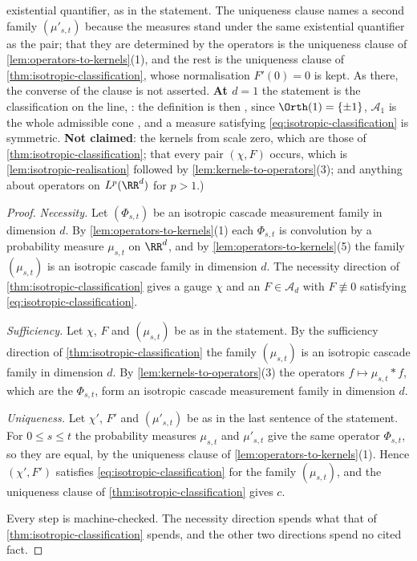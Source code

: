 \begin{theorem}
{existential quantifier, as in the statement. The uniqueness clause names a second family
$(\mu'_{s,t})$ because the measures stand under the same existential quantifier as the pair; that
they are determined by the operators is the uniqueness clause of
\ref{lem:operators-to-kernels}(1), and the rest is the uniqueness clause of
\ref{thm:isotropic-classification}, whose normalisation $F'(0) = 0$ is kept. As there, the converse
of the clause is not asserted. \textbf{At $d = 1$} the statement is the classification on the line,
: the definition is then
, since $\Orth(1) = \{\pm1\}$,
$\mathcal{A}_1$ is the whole admissible cone
, and a measure satisfying
\ref{eq:isotropic-classification} is symmetric. \textbf{Not claimed}: the kernels from scale zero,
which are those of \ref{thm:isotropic-classification}; that every pair $(\chi, F)$ occurs, which is
\ref{lem:isotropic-realisation} followed by \ref{lem:kernels-to-operators}(3); and anything about
operators on $L^p(\RR^d)$ for $p > 1$.)}
\end{theorem}

\begin{proof}
\leanok
\emph{Necessity.} Let $(\Phi_{s,t})$ be an isotropic cascade measurement family in dimension $d$.
By \ref{lem:operators-to-kernels}(1) each $\Phi_{s,t}$ is convolution by a probability measure
$\mu_{s,t}$ on $\RR^d$, and by \ref{lem:operators-to-kernels}(5) the family $(\mu_{s,t})$ is an
isotropic cascade family in dimension $d$. The necessity direction of
\ref{thm:isotropic-classification} gives a gauge $\chi$ and an $F \in \mathcal{A}_d$ with
$F \not\equiv 0$ satisfying \ref{eq:isotropic-classification}.

\emph{Sufficiency.} Let $\chi$, $F$ and $(\mu_{s,t})$ be as in the statement. By the sufficiency
direction of \ref{thm:isotropic-classification} the family $(\mu_{s,t})$ is an isotropic cascade
family in dimension $d$. By \ref{lem:kernels-to-operators}(3) the operators
$f \mapsto \mu_{s,t} * f$, which are the $\Phi_{s,t}$, form an isotropic cascade measurement family
in dimension $d$.

\emph{Uniqueness.} Let $\chi'$, $F'$ and $(\mu'_{s,t})$ be as in the last sentence of the
statement. For $0 \le s \le t$ the probability measures $\mu_{s,t}$ and $\mu'_{s,t}$ give the same
operator $\Phi_{s,t}$, so they are equal, by the uniqueness clause of
\ref{lem:operators-to-kernels}(1). Hence $(\chi', F')$ satisfies
\ref{eq:isotropic-classification} for the family $(\mu_{s,t})$, and the uniqueness clause of
\ref{thm:isotropic-classification} gives $c$.

Every step is machine-checked. The necessity direction spends what that of
\ref{thm:isotropic-classification} spends, and the other two directions spend no cited fact.
\end{proof}


